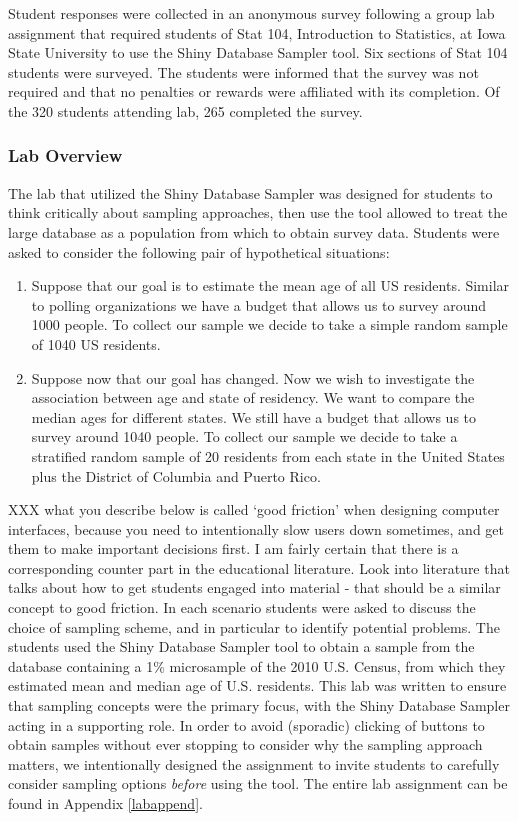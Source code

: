 \documentclass{article}\usepackage[]{graphicx}\usepackage[]{color}
\newcommand{\hh}[1]{{\color{ForestGreen} #1}}
\begin{document}
Student responses were collected in an anonymous survey following a group lab assignment that required students of Stat 104, Introduction to Statistics, at Iowa State University to use the Shiny Database Sampler tool. Six sections of Stat 104 students were surveyed. The students were informed that the survey was not required and that no penalties or rewards were affiliated with its completion.  Of the 320 students attending lab, 265 completed the survey. 

 \subsubsection{Lab Overview} 

The lab that utilized the Shiny Database Sampler was designed for students to think critically about sampling approaches, then use the tool allowed to treat the large database as 
a population from which to obtain survey data. Students were asked to consider the following pair of hypothetical situations:

\begin{enumerate}
\item Suppose that our goal is to estimate the mean age of all US residents. Similar to polling organizations we have a budget that allows us to survey around 1000 people. To collect our sample we decide to take a simple random sample of 1040 US residents.

\item Suppose now that our goal has changed.  Now we wish to investigate the association between age and state of residency. We want to compare the median ages for different states. We still have a budget that allows us to survey around 1040 people. To collect our sample we decide to take a stratified random sample of 20 residents from each state in the United States plus the District of Columbia and Puerto Rico. 
\end{enumerate}

\hh{XXX what you describe below is called `good friction' when designing computer interfaces, because you need to intentionally slow users down sometimes, and get them to make important decisions first. I am fairly certain that there is a corresponding counter part in the educational literature. Look into literature that talks about how to get students engaged into material - that should be a similar concept to good friction.
}
In each scenario students were asked to discuss the choice of sampling scheme, and in particular to identify potential problems. The students used the Shiny Database Sampler tool to obtain a sample from the database containing a 1\% microsample of the 2010 U.S. Census, from which they estimated mean and median age of U.S. residents. This lab was written to ensure that sampling concepts were the primary focus, with the Shiny Database Sampler acting in a supporting role. In order to avoid (sporadic) clicking of buttons to obtain samples without ever stopping to consider why the sampling approach matters, we intentionally designed the assignment to invite students to carefully consider sampling options {\it before} using the tool. The entire lab assignment can be found in Appendix \ref{labappend}. 
\end{document}

